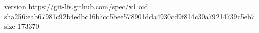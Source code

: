 version https://git-lfs.github.com/spec/v1
oid sha256:eab67981c92b4edbc16b7cc5bee578901dda4930cd9f814c30a79214739c5eb7
size 173370

